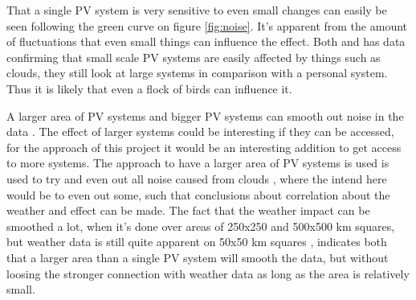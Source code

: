 That a single PV system is very sensitive to even small changes can
easily be seen following the green curve on figure \ref{fig:noise}.
It's apparent from the amount of fluctuations that even small things
can influence the effect.  Both \citep{cloudTrack} and
\citep{southafrica} has data confirming that small scale PV systems
are easily affected by things such as clouds, they still look at large
systems in comparison with a personal system.  Thus it is likely that
even a flock of birds can influence it.

A larger area of PV systems and bigger PV systems can smooth out noise
in the data \citep{southafrica,cloudTrack}.  The effect of larger
systems could be interesting if they can be accessed, for the approach
of this project it would be an interesting addition to get access to
more systems.  The approach to have a larger area of PV systems is
used is used to try and even out all noise caused from clouds
\citep{southafrica}, where the intend here would be to even out some,
such that conclusions about correlation about the weather and effect
can be made.  The fact that the weather impact can be smoothed a lot,
when it's done over areas of 250x250 and 500x500 km squares, but
weather data is still quite apparent on 50x50 km squares
\citep{southafrica}, indicates both that a larger area than a single
PV system will smooth the data, but without loosing the stronger
connection with weather data as long as the area is relatively small.


